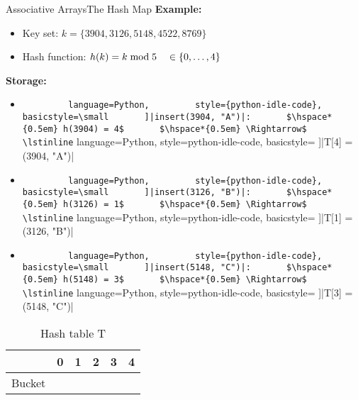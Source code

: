 \begin{frame}{Associative Arrays}{The Hash Map}
  \textbf{Example:}
  \begin{itemize}
    \item
      Key set: $k = \{3904, 3126, 5148, 4522, 8769\}$
    \item
      Hash function:
      $h(k) = k \;\mathrm{mod}\; 5 \hspace*{1.0em} \in \{0, \ldots, 4\}$
  \end{itemize}
  \textbf{Storage:}
  \begin{itemize}
    \item
      \lstinline[
        language=Python,
        style={python-idle-code},
        basicstyle=\small
      ]|insert(3904, "A")|:
      $\hspace*{0.5em} h(3904) = 4$
      $\hspace*{0.5em} \Rightarrow$
      \lstinline[
        language=Python,
        style={python-idle-code},
        basicstyle=\small
      ]|T[4] = (3904, "A")|
    \item
      \lstinline[
        language=Python,
        style={python-idle-code},
        basicstyle=\small
      ]|insert(3126, "B")|:
      $\hspace*{0.5em} h(3126) = 1$
      $\hspace*{0.5em} \Rightarrow$
      \lstinline[
        language=Python,
        style={python-idle-code},
        basicstyle=\small
      ]|T[1] = (3126, "B")|
    \item
      \lstinline[
        language=Python,
        style={python-idle-code},
        basicstyle=\small
      ]|insert(5148, "C")|:
      $\hspace*{0.5em} h(5148) = 3$
      $\hspace*{0.5em} \Rightarrow$
      \lstinline[
        language=Python,
        style={python-idle-code},
        basicstyle=\small
      ]|T[3] = (5148, "C")|
  \end{itemize}
  \vspace*{-1.0em}
  \begin{table}[!b]
    \caption{Hash table T}
    \label{tab:hash_table:example_introduction}
    \begin{tabularx}{0.875\textwidth}{l|ccccc}
      {} & 0 & 1 & 2 & 3 & 4\\
      \midrule
      Bucket &
      {} &
      \lstinline[
        language=Python,
        style={python-idle-code},
        basicstyle=\small
      ]|(3126, "B")| &
      {} &
      \lstinline[
        language=Python,
        style={python-idle-code},
        basicstyle=\small
      ]|(5148, "C")| &
      \lstinline[
        language=Python,
        style={python-idle-code},
        basicstyle=\small
      ]|(3904, "A")|
    \end{tabularx}
  \end{table}
\end{frame}

